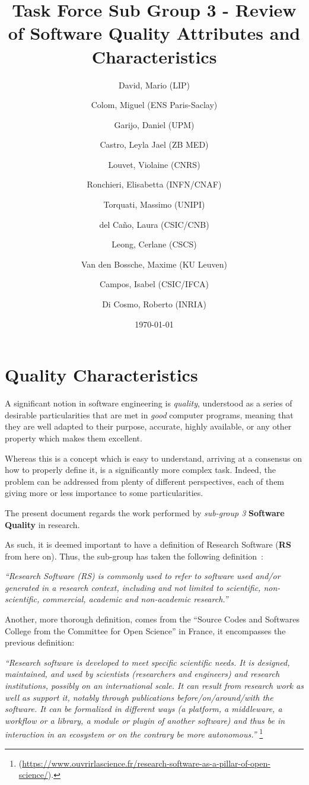 \documentclass[a4paper]{article}
\title{Task Force Sub Group 3 - Review of Software Quality Attributes and Characteristics}
\author{
    David, Mario (LIP) \orcidlink{0000-0003-1802-5356} \and
    Colom, Miguel (ENS Paris-Saclay) \orcidlink{0000-0003-2636-0656} \and
    Garijo, Daniel (UPM) \orcidlink{0000-0003-0454-7145} \and
    Castro, Leyla Jael (ZB MED) \orcidlink{0000-0003-3986-0510} \and
    Louvet, Violaine (CNRS) \orcidlink{0000-0002-8742-8952} \and
    Ronchieri, Elisabetta (INFN/CNAF) \orcidlink{0000-0002-7341-6491} \and
    Torquati, Massimo (UNIPI) \orcidlink{0000-0001-6323-3459} \and
    del Ca\~{n}o, Laura (CSIC/CNB) \orcidlink{0000-0003-0981-2040} \and
    Leong, Cerlane (CSCS)  \orcidlink{0000-0001-8241-6277} \and
    Van den Bossche, Maxime (KU Leuven) \orcidlink{0000-0002-0938-0156} \and
    Campos, Isabel (CSIC/IFCA) \orcidlink{0000-0002-9350-0383} \and
    Di Cosmo, Roberto (INRIA) \orcidlink{0000-0002-7493-5349}
}
\date{\today}
\begin{document}
\maketitle
\tableofcontents

\newpage
\section{Quality Characteristics}

A significant notion in software engineering is \textit{quality}, understood as a series of desirable particularities that are met in \textit{good} computer programs, meaning that they are well adapted to their purpose, accurate, highly available, or any other property which makes them excellent.

Whereas this is a concept which is easy to understand, arriving at a consensus on how to properly define it, is a significantly more complex task. Indeed, the problem can be addressed from plenty of different perspectives, each of them giving more or less importance to some particularities.

The present document regards the work performed by \textit{sub-group 3} \textbf{Software Quality} in research.

As such, it is deemed important to have a definition of Research Software (\textbf{RS} from here on). Thus, the sub-group has taken the following definition~\cite{gruenpeter_defining_2021}: 

\textit{``Research Software (RS) is commonly used to refer to software used and/or generated in a research context, including and not limited to scientific, non-scientific, commercial, academic and non-academic research.''}

Another, more thorough definition, comes from the ``Source Codes and Softwares College from the Committee for Open Science'' in France, it encompasses the previous definition:

\textit{``Research software is developed to meet specific scientific needs. It is designed, maintained, and used by scientists (researchers and engineers) and research institutions, possibly on an international scale. It can result from research work as well as support it, notably through publications before/on/around/with the software. It can be formalized in different ways (a platform, a middleware, a workflow or a library, a module or plugin of another software) and thus be in interaction in an ecosystem or on the contrary be more autonomous.''} \footnote{(\url{https://www.ouvrirlascience.fr/research-software-as-a-pillar-of-open-science/}).}
\end{document}

